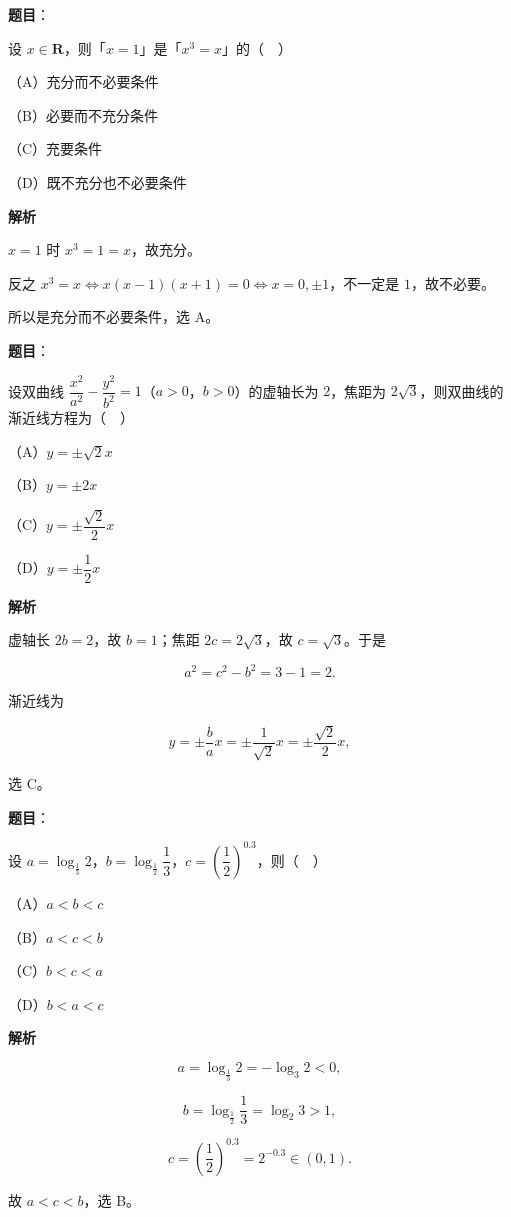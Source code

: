 \begin{answer}

\textbf{题目}：

设 $x\in\mathbf R$，则「$x=1$」是「$x^3=x$」的（　）

（A）充分而不必要条件

（B）必要而不充分条件

（C）充要条件

（D）既不充分也不必要条件

\textbf{解析}

$x=1$ 时 $x^3=1=x$，故充分。

反之 $x^3=x\iff x(x-1)(x+1)=0\iff x=0,\pm1$，不一定是 $1$，故不必要。

所以是充分而不必要条件，选 A。


\end{answer}
\begin{answer}

\textbf{题目}：

设双曲线 $\dfrac{x^2}{a^2}-\dfrac{y^2}{b^2}=1$（$a>0$，$b>0$）的虚轴长为 $2$，焦距为 $2\sqrt3$，则双曲线的渐近线方程为（　）

（A）$y=\pm\sqrt2x$

（B）$y=\pm2x$

（C）$y=\pm\dfrac{\sqrt2}{2}x$

（D）$y=\pm\dfrac12x$

\textbf{解析}

虚轴长 $2b=2$，故 $b=1$；焦距 $2c=2\sqrt3$，故 $c=\sqrt3$。于是

\nopagebreak[4]
\[a^2=c^2-b^2=3-1=2 .\]

渐近线为

\nopagebreak[4]
\[y=\pm\frac ba x=\pm\frac{1}{\sqrt2}x=\pm\frac{\sqrt2}{2}x,\]

选 C。


\end{answer}
\begin{answer}

\textbf{题目}：

设 $a=\log_{\frac13}2$，$b=\log_{\frac12}\dfrac13$，$c=\left(\dfrac12\right)^{0.3}$，则（　）

（A）$a<b<c$

（B）$a<c<b$

（C）$b<c<a$

（D）$b<a<c$

\textbf{解析}

\nopagebreak[4]
\[a=\log_{\frac13}2=-\log_3 2<0,\]

\nopagebreak[4]
\[b=\log_{\frac12}\frac13=\log_2 3>1,\]

\nopagebreak[4]
\[c=\left(\frac12\right)^{0.3}=2^{-0.3}\in(0,1).\]

故 $a<c<b$，选 B。


\end{answer}
